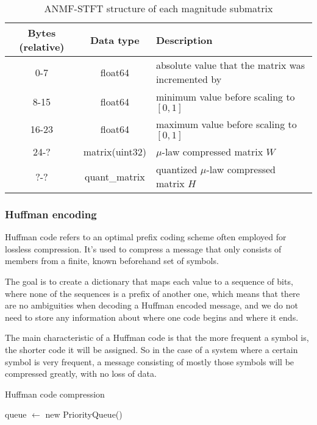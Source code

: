 \begin{table}[htbp]\caption{ANMF-STFT structure of each magnitude submatrix}
	\label{tab:anmf_stft_data}
	\centering
	\begin{tabular}{|c|c|l|}
		\hline
		Bytes (relative) & Data type & Description \\ \hline
		0-7 & float64 & absolute value that the matrix was incremented by \\
		8-15 & float64 & minimum value before scaling to $[0, 1]$ \\
		16-23 & float64 & maximum value before scaling to $[0, 1]$ \\
		24-? & matrix(uint32) & $\mu$-law compressed matrix $W$ \\
		?-? & quant\_matrix & quantized $\mu$-law compressed matrix $H$ \\
		\hline
	\end{tabular}
\end{table}

\subsubsection{Huffman encoding}
\label{sec:huffman}
Huffman code refers to an optimal prefix coding scheme often employed for lossless compression. It's used to compress a message that only consists of members from a finite, known beforehand set of symbols. \cite{huffman_1952}

The goal is to create a dictionary that maps each value to a sequence of bits, where none of the sequences is a prefix of another one, which means that there are no ambiguities when decoding a Huffman encoded message, and we do not need to store any information about where one code begins and where it ends.

The main characteristic of a Huffman code is that the more frequent a symbol is, the shorter code it will be assigned. So in the case of a system where a certain symbol is very frequent, a message consisting of mostly those symbols will be compressed greatly, with no loss of data.

\begin{algorithm}[h]
\caption{Huffman code compression}
\label{alg:huffman}
queue $\leftarrow$ new PriorityQueue()\;
\end{algorithm}

